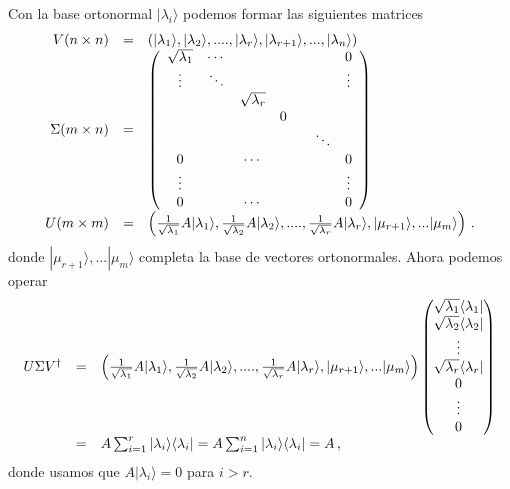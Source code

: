 \documentclass[letterpaper,10pt,english]{jupyterBook}
\newcommand{\bra}[1]{\langle #1|}
\newcommand{\ket}[1]{|#1\rangle}
\begin{document}
\sphinxAtStartPar
Con la base ortonormal \(\ket{\lambda_i}\) podemos formar las siguientes matrices
\begin{equation*}
\begin{split}
\begin{array}{rcl}
V(n\times n) &=& \left(\rule{0mm}{3mm} \ket{\lambda_1},\ket{\lambda_2},....,\ket{\lambda_r},\ket{\lambda_{r+1}},...,\ket{\lambda_n}\right)
\nonumber \\
\Sigma(m\times n) &=&  \rule{0mm}{10mm} \left(
\begin{array}{ccccccc} 
\sqrt{\lambda_1} &\cdots  &    &  & & &  0  \\  \vdots & \ddots & & & & & \vdots  \\  & & \sqrt{\lambda_r} & & & &  \\
   & &  & 0  & &  &    \\ & & & & & \ddots &  \\  0 & &\cdots  & & & & 0  \\ \vdots & &&&& & \vdots \\ 0 & & \cdots & & & & 0
\end{array}
\right)
\nonumber \\
U(m\times m) &=& \rule{0mm}{8mm}\left( \rule{0mm}{3mm} \frac{1}{\sqrt{\lambda_1}}A\ket{\lambda_1}, \frac{1}{\sqrt{\lambda_2}}A\ket{\lambda_2}, ...., 
\frac{1}{\sqrt{\lambda_r}}A\ket{\lambda_r}, \ket{\mu_{r+1}},...\ket{\mu_m} \right) \, .
\nonumber 
\end{array}
\end{split}
\end{equation*}
\sphinxAtStartPar
donde \(\ket{\mu_{r+1}},...\ket{\mu_m}\) completa la base de vectores ortonormales.
Ahora podemos operar
\begin{equation*}
\begin{split}
\begin{array}{rcl}
U\Sigma V^\dagger &=& 
\left( \rule{0mm}{3mm} \frac{1}{\sqrt{\lambda_1}}A\ket{\lambda_1}, \frac{1}{\sqrt{\lambda_2}}A\ket{\lambda_2}, ...., 
\frac{1}{\sqrt{\lambda_r}}A\ket{\lambda_r}, \ket{\mu_{r+1}},...\ket{\mu_m} \right)
\begin{pmatrix} \sqrt{\lambda_1}\bra{\lambda_1} \\ \sqrt{\lambda_2}\bra{\lambda_2}  \\ \vdots \\ \sqrt{\lambda_r}\bra{\lambda_r} \\ 0 \\ \vdots \\ 0 \end{pmatrix} \nonumber\\
&=& A \sum_{i=1}^r \ket{\lambda_i}\bra{\lambda_i} = A \sum_{i=1}^n \ket{\lambda_i}\bra{\lambda_i} = A\, , \nonumber
\end{array}
\end{split}
\end{equation*}
\sphinxAtStartPar
donde usamos que \(A\ket{\lambda_i}=0\) para \(i>r\).
\end{document}
